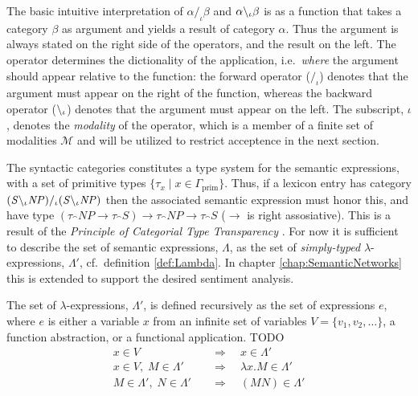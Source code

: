 The basic intuitive interpretation of $\alpha /_\iota \beta$ and $\alpha \backslash_\iota \beta$ is as a function that takes a category $\beta$ as argument and yields a result of category $\alpha$. Thus the argument is always stated on the right side of the operators, and the result on the left. The operator determines the dictionality of the application, i.e.\ \emph{where} the argument should appear relative to the function: the forward operator ($/_\iota$) denotes that the argument must appear on the right of the function, whereas the backward operator ($\backslash_\iota$) denotes that the argument must appear on the left. The subscript, $\iota$, denotes the \emph{modality} of the operator, which is a member of a finite set of modalities $\mathcal{M}$ and will be utilized to restrict acceptence in the next section. 

The syntactic categories constitutes a type system for the semantic expressions, with a set of primitive types $\{ \tau_x \; | \; x \in \Gamma_\mathrm{prim} \}$. Thus, if a lexicon entry has category $({\mathit{S}} \backslash_\iota {\mathit{NP}}) /_\iota ({\mathit{S}} \backslash_\iota {\mathit{NP}})$ then the associated semantic expression must honor this, and have type $(\tau_\cat{NP} \to \tau_\cat{S}) \to \tau_\cat{NP} \to \tau_\cat{S}$ ($\to$ is right assosiative). This is a result of the \emph{Principle of Categorial Type Transparency} \cite[Montague, 1974]{??}. For now it is sufficient to describe the set of semantic expressions, $\Lambda$, as the set of \emph{simply-typed} $\lambda$-expressions, $\Lambda'$, cf.\ definition \ref{def:Lambda}. In chapter \ref{chap:SemanticNetworks} this is extended to support the desired sentiment analysis.

\begin{definition}
The set of $\lambda$-expressions, $\Lambda'$, is defined recursively as the set of expressions $e$, where $e$ is either a variable $x$ from an infinite set of variables $V = \{ v_1, v_2, \ldots \}$, a function abstraction, or a functional application. TODO
\begin{align}
 x \in V                          &\quad \Rightarrow \quad  x \in \Lambda' \tag{Variable} \\
 x \in V, \; M \in \Lambda'          &\quad \Rightarrow \quad  \lambda x . M \in \Lambda' \tag{Abstraction} \\
 M \in \Lambda', \; N \in \Lambda'   &\quad \Rightarrow \quad  (M N) \in \Lambda' \tag{Application} 
 \label{eq:Lambda}
\end{align}
\label{def:Lambda}
\end{definition}

